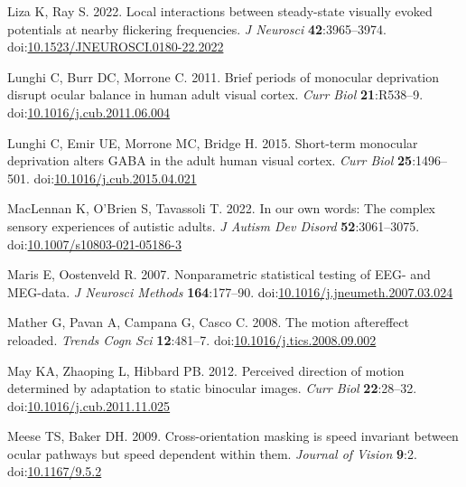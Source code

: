 \documentclass[
]{article}
\newlength{\cslhangindent}
\newlength{\cslentryspacingunit} %
\newenvironment{CSLReferences}[2] %
 {%
  \setlength{\parindent}{0pt}
  \ifodd #1
  \let\oldpar\par
  \def\par{\hangindent=\cslhangindent\oldpar}
  \fi
  \setlength{\parskip}{#2\cslentryspacingunit}
 }%
 {}
\begin{document}
\begin{CSLReferences}{1}{0}
\leavevmode{}%
Liza K, Ray S. 2022. Local interactions between steady-state visually evoked potentials at nearby flickering frequencies. \emph{J Neurosci} \textbf{42}:3965--3974. doi:\href{https://doi.org/10.1523/JNEUROSCI.0180-22.2022}{10.1523/JNEUROSCI.0180-22.2022}

\leavevmode{}%
Lunghi C, Burr DC, Morrone C. 2011. Brief periods of monocular deprivation disrupt ocular balance in human adult visual cortex. \emph{Curr Biol} \textbf{21}:R538--9. doi:\href{https://doi.org/10.1016/j.cub.2011.06.004}{10.1016/j.cub.2011.06.004}

\leavevmode{}%
Lunghi C, Emir UE, Morrone MC, Bridge H. 2015. Short-term monocular deprivation alters GABA in the adult human visual cortex. \emph{Curr Biol} \textbf{25}:1496--501. doi:\href{https://doi.org/10.1016/j.cub.2015.04.021}{10.1016/j.cub.2015.04.021}

\leavevmode{}%
MacLennan K, O'Brien S, Tavassoli T. 2022. In our own words: The complex sensory experiences of autistic adults. \emph{J Autism Dev Disord} \textbf{52}:3061--3075. doi:\href{https://doi.org/10.1007/s10803-021-05186-3}{10.1007/s10803-021-05186-3}

\leavevmode{}%
Maris E, Oostenveld R. 2007. Nonparametric statistical testing of EEG- and MEG-data. \emph{J Neurosci Methods} \textbf{164}:177--90. doi:\href{https://doi.org/10.1016/j.jneumeth.2007.03.024}{10.1016/j.jneumeth.2007.03.024}

\leavevmode{}%
Mather G, Pavan A, Campana G, Casco C. 2008. The motion aftereffect reloaded. \emph{Trends Cogn Sci} \textbf{12}:481--7. doi:\href{https://doi.org/10.1016/j.tics.2008.09.002}{10.1016/j.tics.2008.09.002}

\leavevmode{}%
May KA, Zhaoping L, Hibbard PB. 2012. Perceived direction of motion determined by adaptation to static binocular images. \emph{Curr Biol} \textbf{22}:28--32. doi:\href{https://doi.org/10.1016/j.cub.2011.11.025}{10.1016/j.cub.2011.11.025}

\leavevmode{}%
Meese TS, Baker DH. 2009. Cross-orientation masking is speed invariant between ocular pathways but speed dependent within them. \emph{Journal of Vision} \textbf{9}:2. doi:\href{https://doi.org/10.1167/9.5.2}{10.1167/9.5.2}


\end{CSLReferences}
\end{document}
